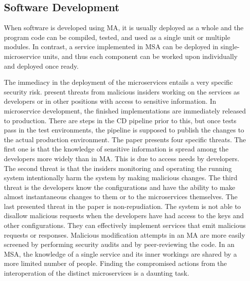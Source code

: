 \subsection{Software Development}
\begin{sloppypar}
    When software is developed using MA, it is usually deployed as a whole and
    the program code can be compiled, tested, and used as a single unit or
    multiple modules. In contrast, a service implemented in MSA can be deployed
    in single-microservice units, and thus each component can be worked upon
    individually and deployed once ready. 
\end{sloppypar}
\begin{sloppypar}
    The immediacy in the deployment of the microservices entails a very specific
    security risk. \citet{integinside} present threats from malicious insiders
    working on the services as developers or in other positions with access to
    sensitive information. In microservice development, the finished
    implementations are immediately released to production. There are steps in
    the CD pipeline prior to this, but once tests pass in the test environments,
    the pipeline is supposed to publish the changes to the actual production
    environment. The paper presents four specific threats. The first one is that
    the knowledge of sensitive information is spread among the developers more
    widely than in MA. This is due to access needs by developers. The second
    threat is that the insiders monitoring and operating the running system
    intentionally harm the system by making malicious changes. The third threat
    is the developers know the configurations and have the ability to make
    almost instantaneous changes to them or to the microservices themselves. The
    last presented threat in the paper is non-repudiation. The system is not
    able to disallow malicious requests when the developers have had access to
    the keys and other configurations. They can effectively implement services
    that emit malicious requests or responses. Malicious modification attempts
    in an MA are more easily screened by performing security audits and by peer-reviewing the code. In an MSA, the knowledge of a single service and its
    inner workings are shared by a more limited number of people. Finding the
    compromised actions from the interoperation of the distinct microservices is
    a daunting task.
\end{sloppypar}

